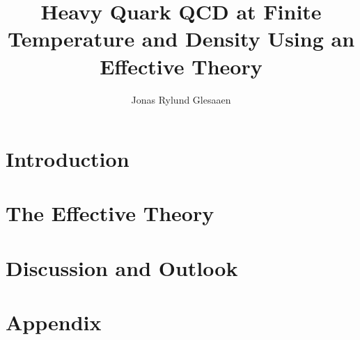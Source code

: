 \documentclass[12pt,twoside,openright]{report}
\author{Jonas Rylund Glesaaen}
\title{Heavy Quark QCD at Finite Temperature and Density Using an Effective Theory}
\begin{document}
\maketitle

\cleardoublepage
{}
\tableofcontents

\cleardoublepage


\cleardoublepage
{}

\part{Introduction}




\part{The Effective Theory}



\part{Discussion and Outlook}



\appendix
\part{Appendix}




\end{document}
